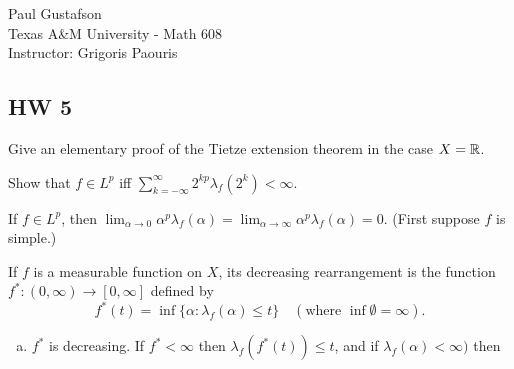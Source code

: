 \documentclass{article}
\begin{document}
\noindent Paul Gustafson\\
\noindent Texas A\&M University - Math 608 \\ 
\noindent Instructor: Grigoris Paouris

\subsection*{HW 5}
 Give an elementary proof of the Tietze extension theorem in the case $X = \mathbb{R}$.


 Show that $f \in L^p$ iff $\sum_{k= -\infty}^\infty 2^{kp} \lambda_f(2^k) < \infty$.

 If $f \in L^p$, then $\lim_{\alpha \to 0} \alpha^p \lambda_f(\alpha) = \lim_{\alpha \to \infty} \alpha^p \lambda_f(\alpha) = 0$. (First suppose $f$ is simple.)

 If $f$ is a measurable function on $X$, its decreasing rearrangement is the function $f^*: (0,\infty) \to [0,\infty]$ defined by 
$$f^*(t) = \inf\{\alpha : \lambda_f(\alpha) \le t\} \quad (\text{where } \inf \emptyset = \infty).$$
\begin{enumerate}[a.]
\item $f^*$ is decreasing. If $f^* < \infty$ then $\lambda_f(f^*(t)) \le t$, and if $\lambda_f(\alpha) < \infty)$ then 
\end{enumerate}

\end{document}
